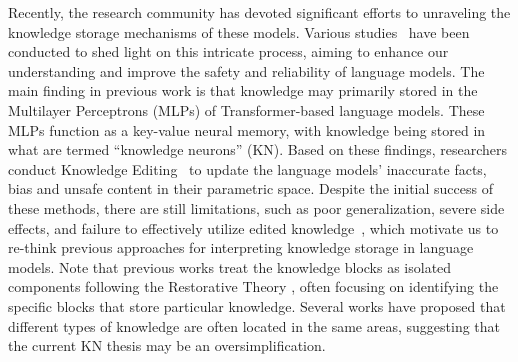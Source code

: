 \documentclass{article}
\begin{document}
Recently, the research community has devoted significant efforts to unraveling the knowledge storage mechanisms of these models.
Various studies~\cite{dai-etal-2022-knowledge,geva-etal-2023-dissecting,geva-etal-2022-transformer,geva-etal-2021-transformer,yu2024locating,chughtai2024summing,meng2022locating,merullo2024language} have been conducted to shed light on this intricate process, aiming to enhance our understanding and improve the safety and reliability of language models.
The main finding in previous work is that knowledge may primarily stored in the Multilayer Perceptrons (MLPs) of Transformer-based language models.
These MLPs function as a key-value neural memory, with knowledge being stored in what are termed ``knowledge neurons'' (KN).
Based on these findings, researchers conduct Knowledge Editing~\cite{meng2022locating,yao-etal-2023-editing} to update the language models' inaccurate facts, bias and unsafe content in their parametric space.
Despite the initial success of these methods, there are still limitations, such as poor generalization, severe side effects, and failure to effectively utilize edited knowledge~\cite{yao-etal-2023-editing,10.1162/tacl_a_00644}, which motivate us to re-think previous approaches for interpreting knowledge storage in language models.
Note that previous works treat the knowledge blocks as isolated components following the Restorative Theory \cite{hopkins2015restorative}, often focusing on identifying the specific blocks that store particular knowledge.
Several works \cite{niu2024what,knowledge_editing_survey_2} have proposed that different types of knowledge are often located in the same areas, suggesting that the current KN thesis may be an oversimplification.
\end{document}
